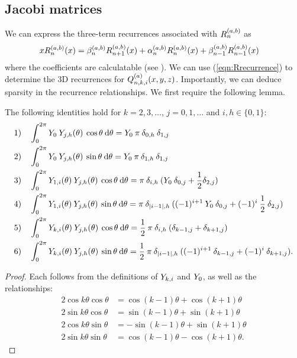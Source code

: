 \documentclass[11pt, oneside]{article}   	%
\begin{document}
\subsection{Jacobi matrices}\label{subsection:jacobimats}

We can express the three-term recurrences associated with $R_n^{(a,b)}$ as
\begin{align}
	x R_n^{(a,b)}(x) &= \beta_n^{(a,b)} R_{n+1}^{(a,b)}(x) + \alpha_n^{(a,b)} R_n^{(a,b)}(x) + \beta_{n-1}^{(a,b)} R_{n-1}^{(a,b)}(x) \label{eqn:Rrecurrence}
\end{align}
where the coefficients are calculatable (see \cite{snowball2019sparse}). We can use (\ref{eqn:Rrecurrence}) to determine the 3D recurrences for $Q_{n,k,i}^{(a)}(x,y,z)$. Importantly, we can deduce sparsity in the recurrence relationships.  We first require the following lemma.

\begin{lemma}\label{lemma:Yrecurrence} 
The following identities hold for $k = 2,3,\dots$, $j = 0,1,\dots$ and $i, h \in \{0,1\}$:
\begin{align*}
	&1) \quad \int_0^{2\pi} Y_0 \: Y_{j,h}(\theta) \: \cos\theta \: {\rm d} \theta = Y_0 \: \pi \: \delta_{0,h} \: \delta_{1,j} \\
	&2) \quad \int_0^{2\pi} Y_0 \: Y_{j,h}(\theta) \: \sin\theta \: {\rm d} \theta = Y_0 \: \pi \: \delta_{1,h} \: \delta_{1,j} \\
	&3) \quad \int_0^{2\pi} Y_{1,i}(\theta) \: Y_{j,h}(\theta) \: \cos\theta \: {\rm d} \theta = \pi \: \delta_{i,h} \: (Y_0 \: \delta_{0,j} + \frac{1}{2} \delta_{2,j}) \\
	&4) \quad \int_0^{2\pi} Y_{1,i}(\theta) \: Y_{j,h}(\theta) \: \sin\theta \: {\rm d} \theta = \pi \:  \delta_{|i-1|,h} \: ((-1)^{i+1} \: Y_0 \: \delta_{0,j} + (-1)^i \: \frac{1}{2} \: \delta_{2,j}) \\
	&5) \quad \int_0^{2\pi} Y_{k,i}(\theta) \: Y_{j,h}(\theta) \: \cos\theta \: {\rm d} \theta = \frac{1}{2} \: \pi \: \delta_{i,h} \: (\delta_{k-1,j} + \delta_{k+1,j}) \\
	&6) \quad \int_0^{2\pi} Y_{k,i}(\theta) \: Y_{j,h}(\theta) \: \sin\theta \: {\rm d} \theta = \frac{1}{2} \: \pi \: \delta_{|i-1|,h} \: ((-1)^{i+1} \: \delta_{k-1,j} + (-1)^i \: \delta_{k+1,j}).
\end{align*}
\end{lemma}

\begin{proof}
Each follows from the definitions of $Y_{k,i}$ and $Y_0$, as well as the relationships:
\begin{align*}
	2 \cos k \theta \cos\theta &= \cos (k-1)\theta + \cos(k+1)\theta \\
	2 \sin k \theta \cos\theta &= \sin (k-1)\theta + \sin(k+1)\theta \\
	2 \cos k \theta \sin\theta &= - \sin (k-1)\theta + \sin(k+1)\theta \\
	2 \sin k \theta \sin\theta &= \cos (k-1)\theta - \cos(k+1)\theta.
\end{align*}
\end{proof}
\end{document}
